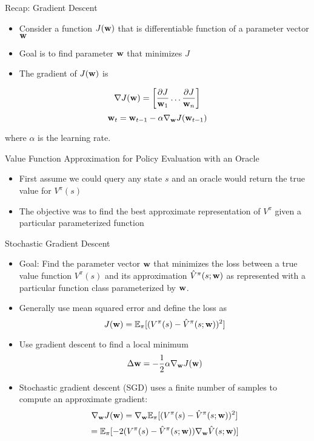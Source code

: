 \documentclass[aspectratio=169]{../latex_main/tntbeamer}  %
\begin{document}
\begin{frame}[c]{Recap: Gradient Descent}
	
	
	\begin{itemize}
		\item Consider a function $J(\mathbf{w})$ that is differentiable function of a parameter vector $\mathbf{w}$
		\item Goal is to find parameter $\mathbf{w}$ that minimizes $J$
		\item The gradient of $J(\mathbf{w})$ is
	\end{itemize}
	$$
	\nabla J(\mathbf{w}) = \left[ \frac{\partial J}{\mathbf{w}_1} \ldots \frac{\partial J}{\mathbf{w}_n} \right]
	$$
	$$\mathbf{w}_t = \mathbf{w}_{t-1} - \alpha \nabla_{\mathbf{w}} J(\mathbf{w}_{t-1})$$
	
	where $\alpha$ is the learning rate.

	
\end{frame}
\begin{frame}[c]{Value Function Approximation for Policy Evaluation with
		an Oracle}
	
	
	\begin{itemize}
		\item First assume we could query any state $s$ and an \alert{oracle} would return
		the true value for $V^\pi (s)$
		\item The objective was to find the best approximate representation of $V^\pi$
		given a particular parameterized function
	\end{itemize}
	
\end{frame}
\begin{frame}[c]{Stochastic Gradient Descent}
	
	
	\begin{itemize}
		\item Goal: Find the parameter vector $\mathbf{w}$ that minimizes the loss between a
		true value function $V^{\pi}(s)$ and its approximation $\hat{V}^\pi(s; \mathbf{w})$ as
		represented with a particular function class parameterized by $\mathbf{w}$.
		\item Generally use mean squared error and define the loss as 
		$$ J(\mathbf{w}) = \mathbb{E}_{\pi} [(V^\pi(s) - \hat{V}^\pi(s;\mathbf{w}))^2]$$
		\item Use gradient descent to find a local minimum 
		$$ \Delta \mathbf{w} = - \frac{1}{2} \alpha \nabla_{\mathbf{w}} J(\mathbf{w})$$
		\item Stochastic gradient descent (SGD) uses a finite number of samples to compute an approximate gradient:
		$$ \nabla_{\mathbf{w}} J(\mathbf{w}) = \nabla_{\mathbf{w}} \mathbb{E}_{\pi}[(V^\pi (s) - \hat{V}^\pi (s; \mathbf{w}))^2]$$
		$$= \mathbb{E}_\pi [-2 (V^\pi(s) - \hat{V}^\pi (s;\mathbf{w})) \nabla_{\mathbf{w}} \hat{V}(s;\mathbf{w})]$$
	\end{itemize}
	
\end{frame}
\end{document}
